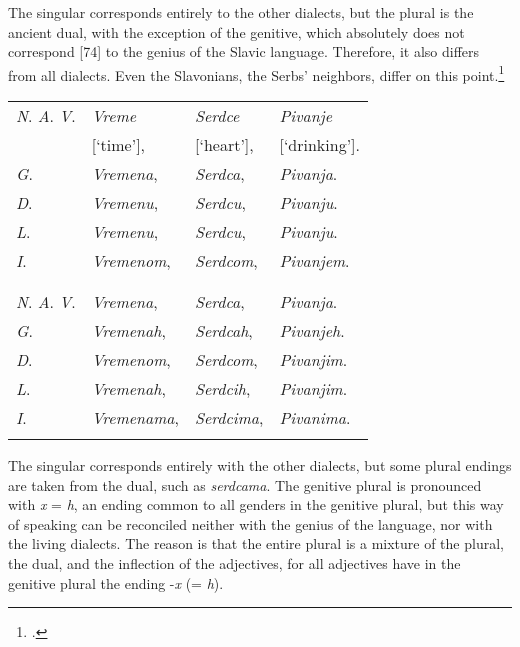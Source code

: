 The singular corresponds entirely to the other dialects, but the plural is the ancient dual, with the exception of the genitive, which absolutely does not correspond [74] to the genius of the Slavic language. Therefore, it also differs from all dialects. Even the Slavonians, the Serbs’ neighbors, differ on this point.\footnote{\citet[39 (\textit{vrime}), 40 (\textit{serdce}, \textit{pivanje})]{lanosovic_anleitung_1795}.}

\begin{longtable}{ l l l l }
    \lsptoprule
    \multicolumn{4}{ c }{Singular.} \\
    \midrule
    \textit{N}. \textit{A}. \textit{V}. & \textit{Vreme} & \textit{Serdce} & \textit{Pivanje} \\
    & [‘time’], & [‘heart’], & [‘drinking’]. \\
    \textit{G}. & \textit{Vremena}, & \textit{Serdca}, & \textit{Pivanja}. \\
    \textit{D}. & \textit{Vremenu}, & \textit{Serdcu}, & \textit{Pivanju}. \\ 
    \textit{L}. & \textit{Vremenu}, & \textit{Serdcu}, & \textit{Pivanju}. \\
    \textit{I}. & \textit{Vremenom}, & \textit{Serdcom}, & \textit{Pivanjem}. \\
    \lspbottomrule
    \\
    \lsptoprule
    \multicolumn{4}{ c }{Plural.} \\
    \midrule
    \textit{N}. \textit{A}. \textit{V}. & \textit{Vremena}, & \textit{Serdca}, & \textit{Pivanja}. \\
    \textit{G}. & \textit{Vremenah}, & \textit{Serdcah}, & \textit{Pivanjeh}. \\
    \textit{D}. & \textit{Vremenom}, & \textit{Serdcom}, & \textit{Pivanjim}. \\
    \textit{L}. & \textit{Vremenah}, & \textit{Serdcih}, & \textit{Pivanjim}. \\
    \textit{I}. & \textit{Vremenama}, & \textit{Serdcima}, & \textit{Pivanima}. \\
    \lspbottomrule
\end{longtable}

The singular corresponds entirely with the other dialects, but some plural endings are taken from the dual, such as \textit{serdcama}. The genitive plural is pronounced with \textit{x} = \textit{h}, an ending common to all genders in the genitive plural, but this way of speaking can be reconciled neither with the genius of the language, nor with the living dialects. The reason is that the entire plural is a mixture of the plural, the dual, and the inflection of the adjectives, for all adjectives have in the genitive plural the ending -\textit{x} (= \textit{h}).

